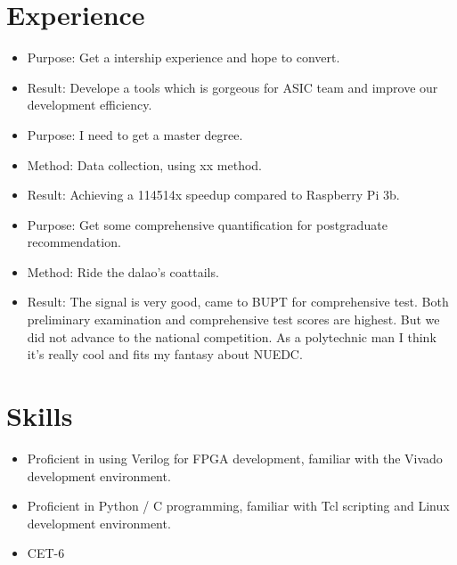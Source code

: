 \documentclass{resume}
\begin{document}
\section{\texorpdfstring{\faUsers}{} Experience}
\begin{itemize}
  \item Purpose: Get a intership experience and hope to convert.
  \item Result: Develope a tools which is gorgeous for ASIC team and improve our development efficiency.
\end{itemize}

\begin{itemize}
  \item Purpose: I need to get a master degree.
  \item Method: Data collection, using xx method.
  \item Result: Achieving a 114514x speedup compared to Raspberry Pi 3b.
\end{itemize}

\begin{itemize}
  \item Purpose: Get some comprehensive quantification for postgraduate recommendation.
  \item Method: Ride the dalao's coattails.
  \item Result: The signal is very good, came to BUPT for comprehensive test. Both preliminary examination and comprehensive test scores are highest. But we did not advance to the national competition. As a polytechnic man I think it's really cool and fits my fantasy about NUEDC.
\end{itemize}

\section{\texorpdfstring{\faCogs}{} Skills}
\begin{itemize}[parsep=0.5ex]
  \item Proficient in using Verilog for FPGA development, familiar with the Vivado development environment.
  \item Proficient in Python / C programming, familiar with Tcl scripting and Linux development environment.
  \item CET-6
\end{itemize}
\end{document}
